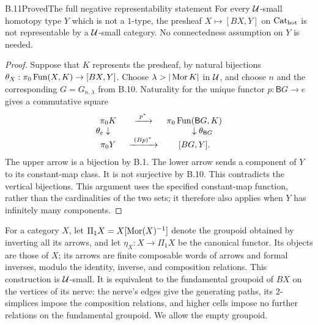 \begin{claim}{B.11}{Proved}{The full negative representability statement}
For every $\mathcal U$-small homotopy type $Y$ which is not a $1$-type, the
presheaf $X\mapsto[BX,Y]$ on ${\mathrm{Cat}_{\mathrm{hot}}}$ is not representable by a
$\mathcal U$-small category.  No connectedness assumption on $Y$ is needed.
\end{claim}
\begin{proof}
Suppose that $K$ represents the presheaf, by natural bijections
$\theta_X:\pi_0\operatorname{Fun}(X,K)\to[BX,Y]$.  Choose
$\lambda>|\operatorname{Mor} K|$ in $\mathcal U$, and choose $n$ and the corresponding
$G=G_{n,\lambda}$ from B.10.  Naturality for the unique functor
$p:\mathsf B G\to e$ gives a commutative square
\[
\begin{array}{ccc}
\pi_0K&\xrightarrow{\ p^*\ }&\pi_0\Fun(\mathsf B G,K)\\
\theta_e\downarrow\phantom{\theta_e}&&\phantom{\theta_{\mathsf B G}}\downarrow\theta_{\mathsf B G}\\
\pi_0Y&\xrightarrow{\ (Bp)^*\ }&[BG,Y].
\end{array}
\]
The upper arrow is a bijection by B.1.  The lower arrow sends a component
of $Y$ to its constant-map class.  It is not surjective by B.10.  This
contradicts the vertical bijections.  This argument uses the specified
constant-map function, rather than the cardinalities of the two sets;
it therefore also applies when $Y$ has infinitely many components.
\end{proof}


For a category $X$, let $\Pi_1X=X[\operatorname{Mor}(X)^{-1}]$ denote the groupoid
obtained by inverting all its arrows, and let
$\eta_X:X\to\Pi_1X$ be the canonical functor.  Its objects are those
of $X$; its arrows are finite composable words of arrows and formal
inverses, modulo the identity, inverse, and composition relations.
This construction is $\mathcal U$-small.  It is equivalent to the fundamental
groupoid of $BX$ on the vertices of its nerve: the nerve's edges give
the generating paths, its $2$-simplices impose the composition
relations, and higher cells impose no further relations on the
fundamental groupoid.  We allow the empty groupoid.


